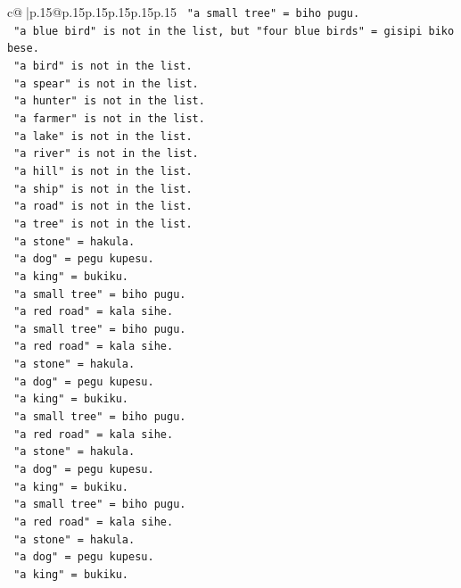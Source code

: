 \documentclass{article}
\begin{document}
{\begin{supertabular}{c@{$\;$}|p{.15\linewidth}@{}p{.15\linewidth}p{.15\linewidth}p{.15\linewidth}p{.15\linewidth}p{.15\linewidth}}
{{{\texttt{   "a small tree" = biho pugu.} \\
\texttt{   "a blue bird" is not in the list, but "four blue birds" = gisipi biko bese.} \\
\texttt{   "a bird" is not in the list.} \\
\texttt{   "a spear" is not in the list.} \\
\texttt{   "a hunter" is not in the list.} \\
\texttt{   "a farmer" is not in the list.} \\
\texttt{   "a lake" is not in the list.} \\
\texttt{   "a river" is not in the list.} \\
\texttt{   "a hill" is not in the list.} \\
\texttt{   "a ship" is not in the list.} \\
\texttt{   "a road" is not in the list.} \\
\texttt{   "a tree" is not in the list.} \\
\texttt{   "a stone" = hakula.} \\
\texttt{   "a dog" = pegu kupesu.} \\
\texttt{   "a king" = bukiku.} \\
\texttt{   "a small tree" = biho pugu.} \\
\texttt{   "a red road" = kala sihe.} \\
\texttt{   "a small tree" = biho pugu.} \\
\texttt{   "a red road" = kala sihe.} \\
\texttt{   "a stone" = hakula.} \\
\texttt{   "a dog" = pegu kupesu.} \\
\texttt{   "a king" = bukiku.} \\
\texttt{   "a small tree" = biho pugu.} \\
\texttt{   "a red road" = kala sihe.} \\
\texttt{   "a stone" = hakula.} \\
\texttt{   "a dog" = pegu kupesu.} \\
\texttt{   "a king" = bukiku.} \\
\texttt{   "a small tree" = biho pugu.} \\
\texttt{   "a red road" = kala sihe.} \\
\texttt{   "a stone" = hakula.} \\
\texttt{   "a dog" = pegu kupesu.} \\
\texttt{   "a king" = bukiku.} \\
}}}
\end{supertabular}}
\end{document}

